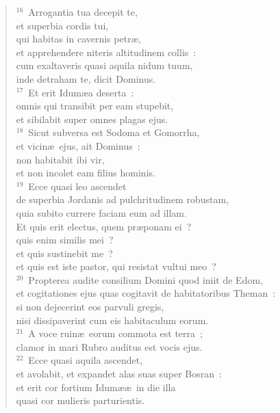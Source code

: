 \begin{verse}
${}^{16}$~Arrogantia tua decepit te,\\ et superbia cordis tui,\\ qui habitas in cavernis petr\ae ,\\ et apprehendere niteris altitudinem collis~:\\ cum exaltaveris quasi aquila nidum tuum,\\ inde detraham te, dicit Dominus.\\
${}^{17}$~Et erit Idum\ae a deserta~:\\ omnis qui transibit per eam stupebit,\\ et sibilabit super omnes plagas ejus.\\
${}^{18}$~Sicut subversa est Sodoma et Gomorrha,\\ et vicin\ae\ ejus, ait Dominus~:\\ non habitabit ibi vir,\\ et non incolet eam filius hominis.\\
${}^{19}$~Ecce quasi leo ascendet\\ de superbia Jordanis ad pulchritudinem robustam,\\ quia subito currere faciam eum ad illam.\\ Et quis erit electus, quem pr\ae ponam ei~?\\ quis enim similis mei~?\\ et quis sustinebit me~?\\ et quis est iste pastor, qui resistat vultui meo~?\\
${}^{20}$~Propterea audite consilium Domini quod iniit de Edom,\\ et cogitationes ejus quas cogitavit de habitatoribus Theman~:\\ si non dejecerint eos parvuli gregis,\\ nisi dissipaverint cum eis habitaculum eorum.\\
${}^{21}$~A voce ruin\ae\ eorum commota est terra~;\\ clamor in mari Rubro auditus est vocis ejus.\\
${}^{22}$~Ecce quasi aquila ascendet,\\ et avolabit, et expandet alas suas super Bosran~:\\ et erit cor fortium Idum\ae \ae\ in die illa\\ quasi cor mulieris parturientis.\end{verse}



